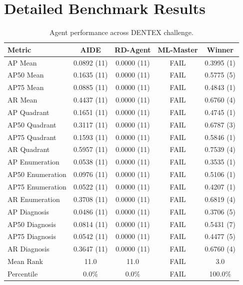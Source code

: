 \clearpage

\appendix
\renewcommand{\thetable}{S\arabic{table}}

\setcounter{table}{0}  


\section{Detailed Benchmark Results}
\label{appendix:tables}

\begin{table}[htbp]
\centering
\small
\caption{Agent performance across DENTEX challenge.}
\vspace{3pt} \label{tab:dentex}
\begin{tabular}{lcccc}
\toprule
\textbf{Metric} & \textbf{AIDE} & \textbf{RD-Agent} & \textbf{ML-Master} & \textbf{Winner} \\
\midrule
AP Mean & 0.0892 (11) & 0.0000 (11) & FAIL & 0.3995 (1) \\
AP50 Mean & 0.1635 (11) & 0.0000 (11) & FAIL & 0.5775 (5) \\
AP75 Mean & 0.0885 (11) & 0.0000 (11) & FAIL & 0.4843 (1) \\
AR Mean & 0.4437 (11) & 0.0000 (11) & FAIL & 0.6760 (4) \\
AP Quadrant & 0.1651 (11) & 0.0000 (11) & FAIL & 0.4745 (1) \\
AP50 Quadrant & 0.3117 (11) & 0.0000 (11) & FAIL & 0.6787 (3) \\
AP75 Quadrant & 0.1593 (11) & 0.0000 (11) & FAIL & 0.5846 (1) \\
AR Quadrant & 0.5957 (11) & 0.0000 (11) & FAIL & 0.7539 (4) \\
AP Enumeration & 0.0538 (11) & 0.0000 (11) & FAIL & 0.3535 (1) \\
AP50 Enumeration & 0.0976 (11) & 0.0000 (11) & FAIL & 0.5106 (1) \\
AP75 Enumeration & 0.0522 (11) & 0.0000 (11) & FAIL & 0.4207 (1) \\
AR Enumeration & 0.3708 (11) & 0.0000 (11) & FAIL & 0.6819 (4) \\
AP Diagnosis & 0.0486 (11) & 0.0000 (11) & FAIL & 0.3706 (5) \\
AP50 Diagnosis & 0.0814 (11) & 0.0000 (11) & FAIL & 0.5431 (7) \\
AP75 Diagnosis & 0.0542 (11) & 0.0000 (11) & FAIL & 0.4477 (5) \\
AR Diagnosis & 0.3647 (11) & 0.0000 (11) & FAIL & 0.6760 (4) \\
\midrule
Mean Rank & 11.0 & 11.0 & FAIL & 3.0 \\
Percentile & 0.0\% & 0.0\% & FAIL & 100.0\% \\
\bottomrule
\end{tabular}
\end{table}

